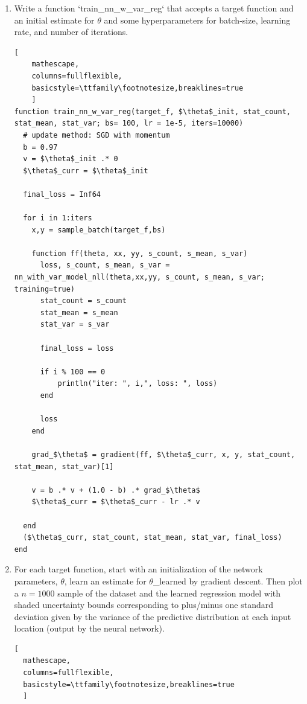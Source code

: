 \documentclass[12pt,letter]{article}
\begin{document}
\begin{enumerate}
\pagebreak

\item Write a function `train\_nn\_w\_var\_reg` that accepts a target function and an initial estimate for $\theta$ and some hyperparameters for batch-size, learning rate, and number of iterations.

\begin{lstlisting}[
    mathescape,
    columns=fullflexible,
    basicstyle=\ttfamily\footnotesize,breaklines=true
    ]
function train_nn_w_var_reg(target_f, $\theta$_init, stat_count, stat_mean, stat_var; bs= 100, lr = 1e-5, iters=10000)
  # update method: SGD with momentum
  b = 0.97
  v = $\theta$_init .* 0
  $\theta$_curr = $\theta$_init

  final_loss = Inf64

  for i in 1:iters
    x,y = sample_batch(target_f,bs)

    function ff(theta, xx, yy, s_count, s_mean, s_var)
      loss, s_count, s_mean, s_var = nn_with_var_model_nll(theta,xx,yy, s_count, s_mean, s_var; training=true)
      stat_count = s_count
      stat_mean = s_mean
      stat_var = s_var

      final_loss = loss

      if i % 100 == 0
          println("iter: ", i,", loss: ", loss)
      end

      loss
    end

    grad_$\theta$ = gradient(ff, $\theta$_curr, x, y, stat_count, stat_mean, stat_var)[1]

    v = b .* v + (1.0 - b) .* grad_$\theta$
    $\theta$_curr = $\theta$_curr - lr .* v

  end
  ($\theta$_curr, stat_count, stat_mean, stat_var, final_loss)
end
\end{lstlisting}

\pagebreak

\item For each target function, start with an initialization of the network parameters, $\theta$, learn an estimate for $\theta$\_learned by gradient descent. Then plot a $n=1000$ sample of the dataset and the learned regression model with shaded uncertainty bounds corresponding to plus/minus one standard deviation given by the variance of the predictive distribution at each input location (output by the neural network).

\begin{lstlisting}[
  mathescape,
  columns=fullflexible,
  basicstyle=\ttfamily\footnotesize,breaklines=true
  ]


\end{lstlisting}
\end{enumerate}
\end{document}
